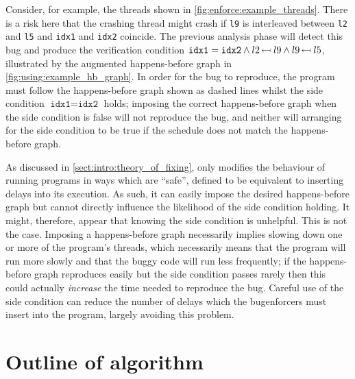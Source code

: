 Consider, for example, the threads shown in
\autoref{fig:enforce:example_threads}.  There is a risk here that the
crashing thread might crash if \verb|l9| is interleaved between
\verb|l2| and \verb|l5| and \texttt{idx1} and \texttt{idx2} coincide.
The previous analysis phase will detect this bug and produce the
verification condition $\texttt{idx1} = \texttt{idx2} \wedge
l2\,{\leftarrowtail}\,l9 \wedge l9\,{\leftarrowtail}\,l5$, illustrated by
the augmented happens-before graph in
\autoref{fig:using:example_hb_graph}.  In order for the bug to
reproduce, the program must follow the happens-before graph shown as
dashed lines whilst the side condition $\texttt{idx1} = \texttt{idx2}$
holds; imposing the correct happens-before graph when the
side condition is false will not reproduce the bug, and neither will
arranging for the side condition to be true if the schedule does not
match the happens-before graph.

As discussed in \autoref{sect:intro:theory_of_fixing}, {\technique}
only modifies the behaviour of running programs in ways which are
``safe'', defined to be equivalent to inserting delays into its
execution.  As such, it can easily impose the desired happens-before
graph but cannot directly influence the likelihood of the
side condition holding.  It might, therefore, appear that knowing the
side condition is unhelpful.  This is not the case.  Imposing a
happens-before graph necessarily implies slowing down one or more of
the program's threads, which necessarily means that the program will
run more slowly and that the buggy code will run less frequently; if
the happens-before graph reproduces easily but the side condition
passes rarely then this could actually \emph{increase} the time needed
to reproduce the bug.  Careful use of the side condition can reduce
the number of delays which the \glspl{bugenforcer} must insert into
the program, largely avoiding this problem.

\section{Outline of algorithm}

